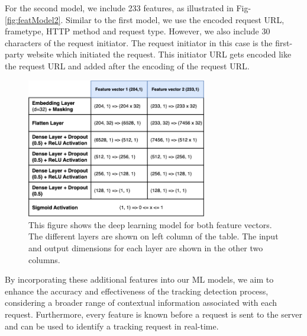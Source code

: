 For the second model, we include 233 features, as illustrated in Fig-\ref{fig:featModel2}. Similar to the first model,
we use the encoded request URL, frametype, HTTP method and request type. However, we also include
30 characters of the request initiator. The request initiator in this case is the first-party website which initiated the request. This 
initiator URL gets encoded like the request URL and added after the encoding of the request URL.

\begin{figure}[ht!]
  \begin{center}
    \includegraphics[width=0.7\textwidth]{images/DL.png}
  \end{center}
  \caption{This figure shows the deep learning model for both feature vectors. The different layers are shown on left column of the table. The input
  and output dimensions for each layer are shown in the other two columns.}
  \label{fig:modelStructure}
\end{figure}

By incorporating these additional features into our ML models, we aim to enhance the accuracy and effectiveness of
the tracking detection process, considering a broader range of contextual information associated with each request. 
Furthermore, every feature is known before a request is sent to the server and can be used to identify a tracking request
in real-time.

